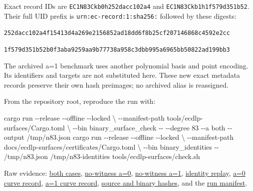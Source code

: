 \documentclass[
  10pt,
]{article}
\newenvironment{Shaded}{}{}
\newcommand{\AttributeTok}[1]{\textcolor[rgb]{0.49,0.56,0.16}{#1}}
\newcommand{\DataTypeTok}[1]{\textcolor[rgb]{0.56,0.13,0.00}{#1}}
\newcommand{\ExtensionTok}[1]{#1}
\newcommand{\NormalTok}[1]{#1}
\begin{document}
Exact record IDs are \texttt{EC1N83Ckb0h252dacc102a4} and
\texttt{EC1N83Ckb1h1f579d351b52}. Their full UID prefix is
\texttt{urn:ec-record:1:sha256:} followed by these digests:

\texttt{252dacc102a4f15413d4a269e2156852ad18dd6f8b25cf207146868c4592e2cc}

\texttt{1f579d351b52b0f3aba9259aa9b77738a958c3dbb995a6965bb50822ad199bb3}

The archived a=1 benchmark uses another polynomial basis and point
encoding. Its identifiers and targets are not substituted here. These
new exact metadata records preserve their own hash preimages; no
archived alias is reassigned.

From the repository root, reproduce the run with:

\begin{Shaded}
\begin{Highlighting}[]
\ExtensionTok{cargo}\NormalTok{ run }\AttributeTok{{-}{-}release} \AttributeTok{{-}{-}offline} \AttributeTok{{-}{-}locked} \DataTypeTok{\textbackslash{}}
  \AttributeTok{{-}{-}manifest{-}path}\NormalTok{ tools/ecdlp{-}surfaces/Cargo.toml }\DataTypeTok{\textbackslash{}}
  \AttributeTok{{-}{-}bin}\NormalTok{ binary\_surface\_check }\AttributeTok{{-}{-}} \AttributeTok{{-}{-}degree}\NormalTok{ 83 }\AttributeTok{{-}{-}a}\NormalTok{ both }\AttributeTok{{-}{-}output}\NormalTok{ /tmp/n83.json}
\ExtensionTok{cargo}\NormalTok{ run }\AttributeTok{{-}{-}release} \AttributeTok{{-}{-}offline} \AttributeTok{{-}{-}locked} \DataTypeTok{\textbackslash{}}
  \AttributeTok{{-}{-}manifest{-}path}\NormalTok{ docs/ecdlp{-}surfaces/certificates/Cargo.toml }\DataTypeTok{\textbackslash{}}
  \AttributeTok{{-}{-}bin}\NormalTok{ binary\_identities }\AttributeTok{{-}{-}}\NormalTok{ /tmp/n83.json /tmp/n83{-}identities}
\ExtensionTok{tools/ecdlp{-}surfaces/check.sh}
\end{Highlighting}
\end{Shaded}

Raw evidence: \href{../../runs/run-20261012T0331Z/n83.json}{both cases},
\href{../../runs/run-20261012T0331Z/no_witness_a0.json}{no-witness a=0},
\href{../../runs/run-20261012T0331Z/no_witness_a1.json}{no-witness a=1},
\href{../../runs/run-20261012T0331Z/identities/identity_replay.json}{identity
replay},
\href{../../runs/run-20261012T0331Z/identities/curve_record_a0.json}{a=0
curve record},
\href{../../runs/run-20261012T0331Z/identities/curve_record_a1.json}{a=1
curve record},
\href{../../runs/run-20261012T0331Z/source_and_binary.sha256}{source and
binary hashes}, and the
\href{../../runs/run-20261012T0331Z/manifest.json}{run manifest}.
\end{document}
